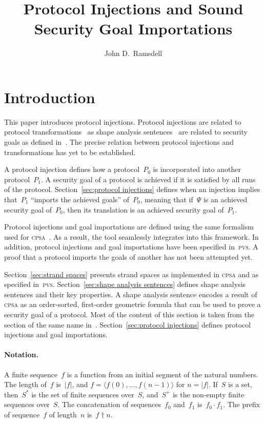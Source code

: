\documentclass[12pt]{article}
\title{Protocol Injections and Sound\\ Security Goal Importations}
\author{John D.\ Ramsdell}
\newcommand{\cpsa}{\textsc{cpsa}}
\newcommand{\pvs}{\textsc{pvs}}
\newcommand{\seq}[1]{\ensuremath{\langle#1\rangle}}
\newcommand{\prefix}[2]{#1\dagger#2}
\newcommand{\append}{\cdot}
\begin{document}
\maketitle

\section{Introduction}

This paper introduces protocol injections.  Protocol injections are
related to protocol transformations~\cite{Guttman12a} as shape
analysis sentences~\cite{Ramsdell12} are related to security goals as
defined in~\cite{Guttman12a}.  The precise relation between protocol
injections and transformations has yet to be established.

A protocol injection defines how a protocol~$P_0$ is incorporated into
another protocol~$P_1$.  A security goal of a protocol is achieved if
it is satisfied by all runs of the protocol.
Section~\ref{sec:protocol injections} defines when an injection
implies that~$P_1$ ``imports the achieved goals'' of~$P_0$, meaning
that if~$\Psi$ is an achieved security goal of~$P_0$, then its
translation is an achieved security goal of~$P_1$.

Protocol injections and goal importations are defined using the same
formalism used for {\cpsa}~\cite{cpsaspec09}.  As a result, the tool
seamlessly integrates into this framework.  In addition, protocol
injections and goal importations have been specified in~{\pvs}.  A
proof that a protocol imports the goals of another has not been
attempted yet.

Section~\ref{sec:strand spaces} presents strand spaces as implemented
in {\cpsa} and as specified in~{\pvs}.  Section~\ref{sec:shape
  analysis sentences} defines shape analysis sentences and their key
properties.  A shape analysis sentence encodes a result of {\cpsa}
as an order-sorted, first-order geometric formula that can be used to
prove a security goal of a protocol.  Most of the content of this
section is taken from the section of the same name
in~\cite{Ramsdell12}.  Section~\ref{sec:protocol injections} defines
protocol injections and goal importations.

\paragraph{Notation.}

A finite sequence~$f$ is a function from an initial segment of the
natural numbers.  The length of~$f$ is~$|f|$, and $f=\seq{f(0),\ldots,
  f(n-1)}$ for $n=|f|$.  If~$S$ is a set, then~$S^\ast$ is the set of
finite sequences over~$S$, and~$S^+$ is the non-empty finite sequences
over~$S$.  The concatenation of sequences~$f_0$ and~$f_1$
is~$f_0\append f_1$.  The prefix of sequence~$f$ of length~$n$
is~$\prefix{f}{n}$.
\end{document}
